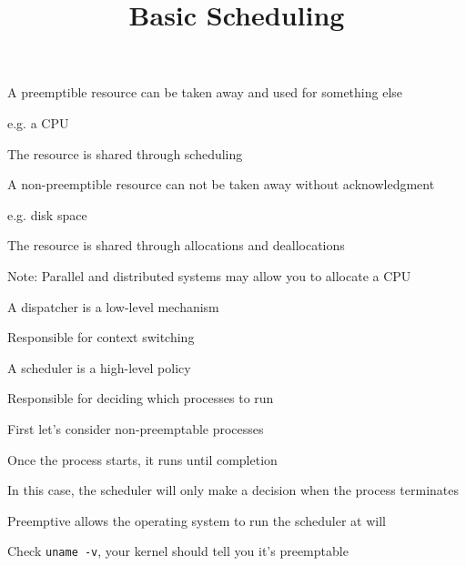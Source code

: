 

\title{Basic Scheduling}


  \begin{frame}
    \titlepage
  \end{frame}

  \begin{slide}

    A preemptible resource can be taken away and used for something else

    \leftspace{}e.g. a CPU
    \medskip

    The resource is shared through scheduling
    \bigskip

    A non-preemptible resource can not be taken away without acknowledgment

    \leftspace{}e.g. disk space
    \medskip

    The resource is shared through allocations and deallocations

    \leftspace{}Note: Parallel and distributed systems may allow you to allocate a CPU
  \end{slide}

  \begin{slide}


    A dispatcher is a low-level mechanism

    \leftspace{}Responsible for context switching
    \medskip

    A scheduler is a high-level policy

    \leftspace{}Responsible for deciding which processes to run

  \end{slide}

  \begin{slide}


    First let's consider non-preemptable processes

    \leftspace{}Once the process starts, it runs until completion
    \medskip

    In this case, the scheduler will only make a decision when the process
    terminates
    \bigskip

    Preemptive allows the operating system to run the scheduler at will

    \leftspace{}Check \texttt{uname -v}, your kernel should tell you it's preemptable

  \end{slide}

